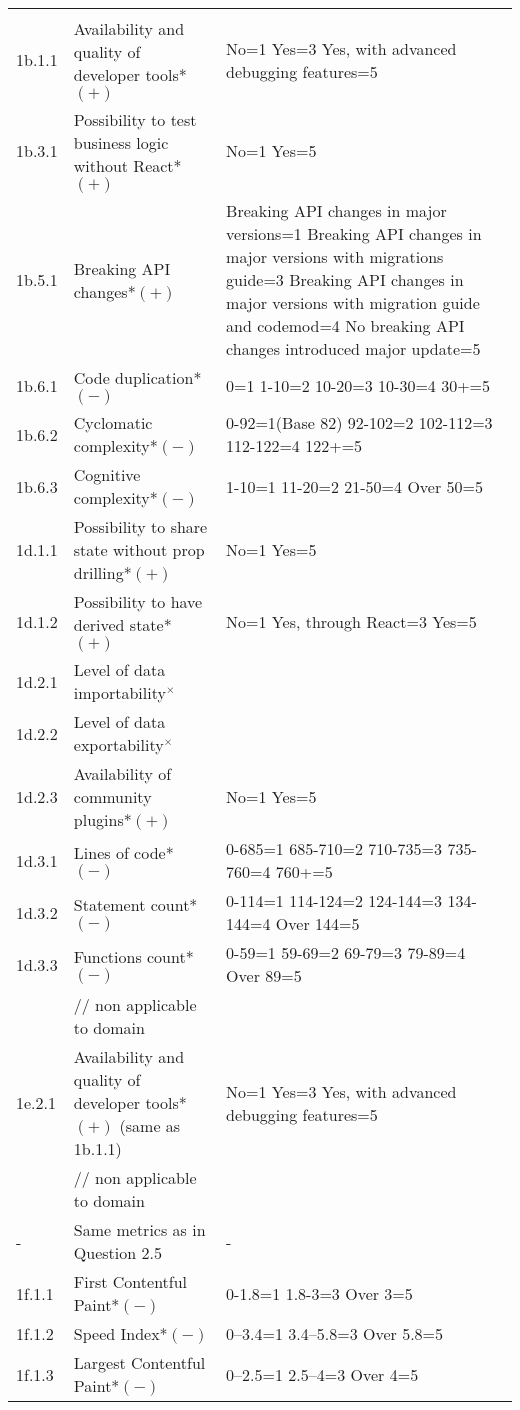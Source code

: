 \begin{longtable}[]{|p{1cm}p{6cm}p{6cm}|}
& & \\
1b.1.1 & Availability and quality of developer tools*$(+)$ & No=1 Yes=3 Yes,
with advanced debugging features=5 \\
1b.3.1 & Possibility to test business logic without React*$(+)$ & No=1 Yes=5 \\
1b.5.1 & Breaking API changes*$(+)$ & Breaking API changes in major versions=1
Breaking API changes in major versions with migrations guide=3 Breaking
API changes in major versions with migration guide and codemod=4 No
breaking API changes introduced major update=5 \\
1b.6.1 & Code duplication*$(-)$ & 0=1 1-10=2 10-20=3 10-30=4 30+=5 \\
1b.6.2 & Cyclomatic complexity*$(-)$ & 0-92=1(Base 82) 92-102=2 102-112=3 112-122=4 122+=5 \\
1b.6.3 & Cognitive complexity*$(-)$ & 1-10=1 11-20=2 21-50=4 Over 50=5 \\
1d.1.1 & Possibility to share state without prop drilling*$(+)$ & No=1 Yes=5 \\
1d.1.2 & Possibility to have derived state*$(+)$ & No=1 Yes, through React=3 Yes=5 \\
1d.2.1 & Level of data importability$^{\times}$ & \\
1d.2.2 & Level of data exportability$^{\times}$ & \\
1d.2.3 & Availability of community plugins*$(+)$ & No=1 Yes=5 \\
1d.3.1 & Lines of code*$(-)$ & 0-685=1 685-710=2 710-735=3 735-760=4 760+=5 \\
1d.3.2 & Statement count*$(-)$ & 0-114=1 114-124=2 124-144=3 134-144=4 Over
144=5 \\
1d.3.3 & Functions count*$(-)$ & 0-59=1 59-69=2 69-79=3 79-89=4 Over 89=5 \\
& // non applicable to domain & \\
1e.2.1 & Availability and quality of developer tools*$(+)$ (same as 1b.1.1) &
No=1 Yes=3 Yes, with advanced debugging features=5 \\
& // non applicable to domain & \\
- & Same metrics as in Question 2.5 & - \\
1f.1.1 & First Contentful Paint*$(-)$ & 0-1.8=1 1.8-3=3 Over 3=5 \\
1f.1.2 & Speed Index*$(-)$ & 0--3.4=1 3.4--5.8=3 Over 5.8=5 \\
1f.1.3 & Largest Contentful Paint*$(-)$ & 0--2.5=1 2.5--4=3 Over 4=5 \\

\end{longtable}
